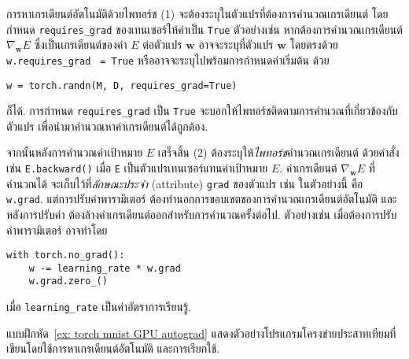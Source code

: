 การหาเกรเดียนต์อัตโนมัติด้วยไพทอร์ช 
(1) จะต้องระบุในตัวแปรที่ต้องการคำนวณเกรเดียนต์
โดยกำหนด \verb|requires_grad| ของเทนเซอร์ให้ค่าเป็น \texttt{True}
ตัวอย่างเช่น หากต้องการคำนวณเกรเดียนต์ $\nabla_{\bm{w}} E$ ซึ่งเป็นเกรเดียนต์ของค่า $E$ ต่อตัวแปร $\bm{w}$
อาจจะระบุที่ตัวแปร $\bm{w}$ โดยตรงด้วย \verb|w.requires_grad|
\texttt{ = True}
หรืออาจจะระบุไปพร้อมการกำหนดค่าเริ่มต้น ด้วย
\begin{Verbatim}[fontsize=\small]
w = torch.randn(M, D, requires_grad=True)
\end{Verbatim}
ก็ได้.
การกำหนด \verb|requires_grad| เป็น \texttt{True}
จะบอกให้ไพทอร์ชติดตามการคำนวณที่เกี่ยวข้องกับตัวแปร เพื่อนำมาคำนวณหาค่าเกรเดียนต์ได้ถูกต้อง.

จากนั้นหลังการคำนวณค่าเป้าหมาย $E$ เสร็จสิ้น (2) ต้องระบุให้\textit{ไพทอร์ช}คำนวณเกรเดียนต์
ด้วยคำสั่ง เช่น \verb|E.backward()| เมื่อ \verb|E| เป็นตัวแปรเทนเซอร์แทนค่าเป้าหมาย $E$.
ค่าเกรเดียนต์ $\nabla_{\bm{w}} E$ ที่คำนวณได้ จะเก็บไว้ที่\textit{ลักษณะประจำ} (attribute) \verb|grad|
ของตัวแปร เช่น ในตัวอย่างนี้ คือ \verb|w.grad|.
แต่การปรับค่าพารามิเตอร์ ต้องทำนอกการขอบเขตของการคำนวณเกรเดียนต์อัตโนมัติ
และหลังการปรับค่า ต้องล้างค่าเกรเดียนต์ออกสำหรับการคำนวณครั้งต่อไป.
ตัวอย่างเช่น เมื่อต้องการปรับค่าพารามิเตอร์ อาจทำโดย
\begin{Verbatim}[fontsize=\small]
with torch.no_grad():
    w -= learning_rate * w.grad
    w.grad.zero_()
\end{Verbatim}
เมื่อ \verb|learning_rate| เป็นค่าอัตราการเรียนรู้.

แบบฝึกหัด~\ref{ex: torch mnist GPU autograd} 
แสดงตัวอย่างโปรแกรมโครงข่ายประสาทเทียมที่เขียนโดยใช้การหาเกรเดียนต์อัตโนมัติ
และการเรียกใช้.


